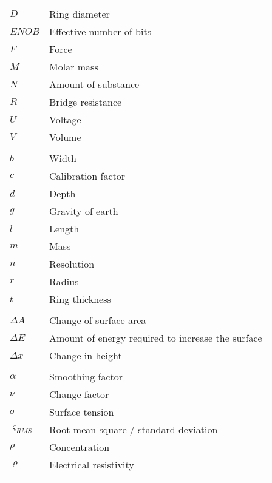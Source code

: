 %
\begin{longtable}[l]{@{}ll@{}}
	\( D \) & Ring diameter\\
	\( ENOB \) & Effective number of bits\\
	\( F \) & Force\\
	\( M \) & Molar mass\\
	\( N \) & Amount of substance\\
	\( R \) & Bridge resistance\\
	\( U \) & Voltage\\
	\( V \) & Volume\\
	\\
	\( b \) & Width\\
	\( c \) & Calibration factor\\
	\( d \) & Depth\\
	\( g \) & Gravity of earth\\
	\( l \) & Length\\
	\( m \) & Mass\\
	\( n \) & Resolution\\
	\( r \) & Radius\\
	\( t \) & Ring thickness\\
	\\
	\( \Delta A \) & Change of surface area\\
	\( \Delta E \) & Amount of energy required to increase the surface\\
	\( \Delta x \) & Change in height\\
	\\
	\( \alpha \) & Smoothing factor\\
	\( \nu \) & Change factor\\
	\( \sigma \) & Surface tension\\
	\( \varsigma_{RMS} \) & Root mean square / standard deviation\\
	\( \rho \) & Concentration\\
	\( \varrho \) & Electrical resistivity\\
	\label{tab:glossar}
\end{longtable}
